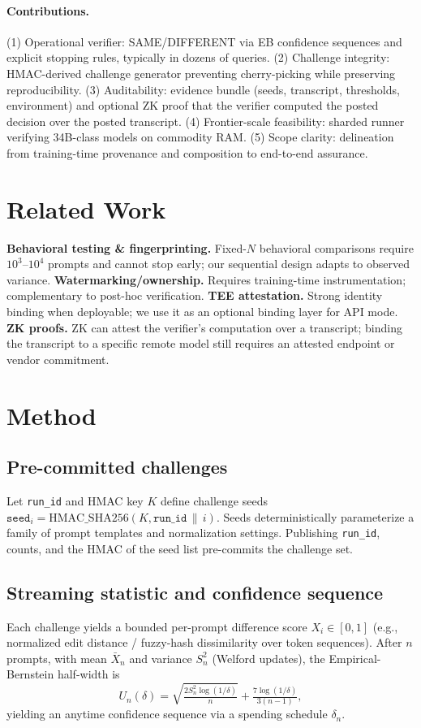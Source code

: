 \documentclass{article}
\begin{document}
\paragraph{Contributions.}
(1) Operational verifier: SAME/DIFFERENT via EB confidence sequences and explicit stopping rules, typically in dozens of queries.
(2) Challenge integrity: HMAC-derived challenge generator preventing cherry-picking while preserving reproducibility.
(3) Auditability: evidence bundle (seeds, transcript, thresholds, environment) and optional ZK proof that the verifier computed the posted decision over the posted transcript.
(4) Frontier-scale feasibility: sharded runner verifying 34B-class models on commodity RAM.
(5) Scope clarity: delineation from training-time provenance and composition to end-to-end assurance.

\section{Related Work}
\textbf{Behavioral testing \& fingerprinting.} Fixed-$N$ behavioral comparisons require $10^3$--$10^4$ prompts and cannot stop early; our sequential design adapts to observed variance.
\textbf{Watermarking/ownership.} Requires training-time instrumentation; complementary to post-hoc verification.
\textbf{TEE attestation.} Strong identity binding when deployable; we use it as an optional binding layer for API mode.
\textbf{ZK proofs.} ZK can attest the verifier's computation over a transcript; binding the transcript to a specific remote model still requires an attested endpoint or vendor commitment.

\section{Method}
\subsection{Pre-committed challenges}
Let \texttt{run\_id} and HMAC key $K$ define challenge seeds
$\texttt{seed}_i=\mathrm{HMAC\_SHA256}(K, \texttt{run\_id}\,\|\, i)$.
Seeds deterministically parameterize a family of prompt templates and normalization settings. Publishing \texttt{run\_id}, counts, and the HMAC of the seed list pre-commits the challenge set.

\subsection{Streaming statistic and confidence sequence}
Each challenge yields a bounded per-prompt difference score $X_i\in[0,1]$ (e.g., normalized edit distance / fuzzy-hash dissimilarity over token sequences).
After $n$ prompts, with mean $\bar X_n$ and variance $S_n^2$ (Welford updates), the Empirical-Bernstein half-width is
\begin{equation}
U_n(\delta)=\sqrt{\tfrac{2S_n^2\log(1/\delta)}{n}}+\tfrac{7\log(1/\delta)}{3(n-1)},
\end{equation}
yielding an anytime confidence sequence via a spending schedule $\delta_n$.
\end{document}
